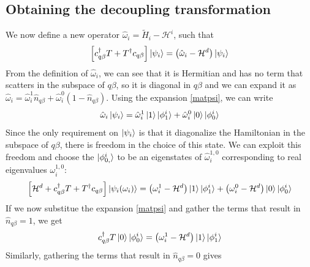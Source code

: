 \subsection*{Obtaining the decoupling transformation}
We now define a new operator \(\hat \omega_i = \tilde H_i - \mathcal{H}^i\), such that 
\begin{equation}\begin{aligned}
	\left[c^\dagger_{q\beta}T + T^\dagger c_{q\beta}\right]\ket{\psi_i} = \left(\hat \omega_i - \mathcal{H}^d\right)\ket{\psi_i}
\end{aligned}\end{equation}
From the definition of \(\hat \omega_i\), we can see that it is Hermitian and has no term that scatters in the subspace of \(q\beta\), so it is diagonal in \(q\beta\) and we can expand it as \(\hat \omega_i = \hat \omega_i^1 \hat n_{q\beta} + \hat \omega_i^0 \left(1 - \hat n_{q\beta}\right)\). Using the expansion \ref{matpsi}, we can write
\begin{equation}\begin{aligned}
\hat \omega_i \ket{\psi_i} = \hat \omega_i^1 \ket{1}\ket{\phi_1^i} + \hat \omega_i^0 \ket{0}\ket{\phi_0^i}
\end{aligned}\end{equation}
Since the only requirement on \(\ket{\psi_i}\) is that it diagonalize the Hamiltonian in the subspace of \(q\beta\), there is freedom in the choice of this state. We can exploit this freedom and choose the \(\ket{\phi_{0,}^i}\) to be an eigenstates of \(\hat \omega_i^{1,0}\) corresponding to real eigenvalues \(\omega_i^{1,0}\):
\begin{equation}\begin{aligned}
	\left[\mathcal{H}^d + c^\dagger_{q\beta}T + T^\dagger c_{q\beta}\right]\ket{\psi_i(\omega_i)} = \left(\omega_i^1 - \mathcal{H}^d\right)\ket{1}\ket{\phi_1^i} + \left(\omega_i^0 - \mathcal{H}^d\right)\ket{0}\ket{\phi_0^i}
\end{aligned}\end{equation}
If we now substitue the expansion \ref{matpsi} and gather the terms that result in \(\hat n_{q\beta}=1\), we get
\begin{equation}\begin{aligned}
	\label{changea}
	c^\dagger_{q\beta}T\ket{0}\ket{\phi_0^i} = \left(\omega_i^1 - \mathcal{H}^d\right)\ket{1}\ket{\phi_1^i}
\end{aligned}\end{equation}
Similarly, gathering the terms that result in \(\hat n_{q\beta}=0\) gives

